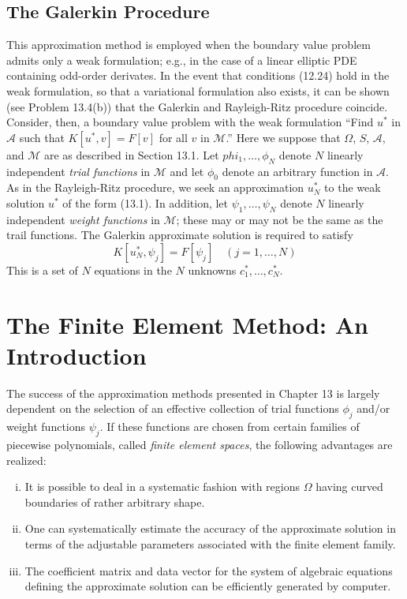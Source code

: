 \documentclass[11pt]{book}
\theoremstyle{example}
\theoremstyle{problem}
\theoremstyle{theorem}
\theoremstyle{definition}
\begin{document}
\section{The Galerkin Procedure}
This approximation method is employed when the boundary value problem admits only a weak formulation; e.g., in the case of a linear elliptic PDE containing odd-order derivates. In the event that conditions (12.24) hold in the weak formulation, so that a variational formulation also exists, it can be shown (see Problem 13.4(b)) that the Galerkin and Rayleigh-Ritz procedure coincide.\\
Consider, then, a boundary value problem with the weak formulation ``Find $u^*$ in $\mathscr{A}$ such that $K[u^*,v]=F[v]$ for all $v$ in $\mathscr{M}$.'' Here we suppose that $\Omega$, $S$, $\mathscr{A}$, and $\mathscr{M}$ are as described in Section 13.1. Let $phi_1,\dots,\phi_N$ denote $N$ linearly independent \emph{trial functions} in $\mathscr{M}$ and let $\phi_0$ denote an arbitrary function in $\mathscr{A}$. As in the Rayleigh-Ritz procedure, we seek an approximation $u_N^*$ to the weak solution $u^*$ of the form (13.1). In addition, let $\psi_1,\dots,\psi_N$ denote $N$ linearly independent \emph{weight functions} in $\mathscr{M}$; these may or may not be the same as the trail functions. The Galerkin approximate solution is required to satisfy
\begin{equation}
	K[u_N^*,\psi_j]=F[\psi_j]\quad(j=1,\dots,N)
\end{equation}
This is a set of $N$ equations in the $N$ unknowns $c_1^*,\dots,c_N^*$.

\chapter[FEM Introduction]{The Finite Element Method: An Introduction}
The success of the approximation methods presented in Chapter 13 is largely dependent on the selection of an effective collection of trial functions $\phi_j$ and/or weight functions $\psi_j$. If these functions are chosen from certain families of piecewise polynomials, called \emph{finite element spaces}, the following advantages are realized:
\begin{enumerate}[(i)]
	\item It is possible to deal in a systematic fashion with regions $\Omega$ having curved boundaries of rather arbitrary shape.
	\item One can systematically estimate the accuracy of the approximate solution in terms of the adjustable parameters associated with the finite element family.
	\item The coefficient matrix and data vector for the system of algebraic equations defining the approximate solution can be efficiently generated by computer.
\end{enumerate}
\end{document}
